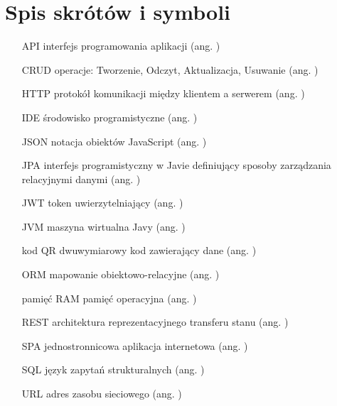 \chapter{Spis skrótów i symboli}

\begin{itemize}
\item[API] interfejs programowania aplikacji (ang. )
\item[CRUD] operacje: Tworzenie, Odczyt, Aktualizacja, Usuwanie (ang. )
\item[HTTP] protokół komunikacji między klientem a serwerem (ang. )
\item[IDE] środowisko programistyczne (ang. )
\item[JSON] notacja obiektów JavaScript (ang. )
\item[JPA] interfejs programistyczny w Javie definiujący sposoby zarządzania relacyjnymi danymi (ang. )
\item[JWT] token uwierzytelniający (ang. )
\item[JVM] maszyna wirtualna Javy (ang. )
\item[kod QR] dwuwymiarowy kod zawierający dane (ang. )
\item[ORM] mapowanie obiektowo-relacyjne (ang. )
\item[pamięć RAM] pamięć operacyjna (ang. )
\item[REST] architektura reprezentacyjnego transferu stanu (ang. )
\item[SPA] jednostronnicowa aplikacja internetowa (ang. )
\item[SQL] język zapytań strukturalnych (ang. )
\item[URL] adres zasobu sieciowego (ang. )
\end{itemize}
